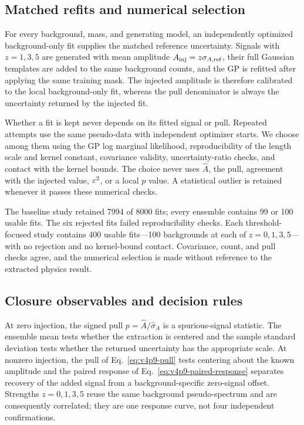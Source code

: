 \subsection{Matched refits and numerical selection}

For every background, mass, and generating model, an independently optimized background-only
fit supplies the matched reference uncertainty.  Signals with
$z=1,3,5$ are generated with mean amplitude
$A_{\rm inj}=z\sigma_{A,{\rm ref}}$, their full Gaussian templates are added to the
same background counts, and the GP is refitted after applying the same training mask.
The injected amplitude is therefore calibrated to the local background-only fit,
whereas the pull denominator is always the uncertainty returned by the injected fit.

Whether a fit is kept never depends on its fitted signal or pull.  Repeated attempts
use the same pseudo-data with independent optimizer starts.  We choose among them using
the GP log marginal likelihood, reproducibility of the length scale and kernel
constant, covariance validity, uncertainty-ratio checks, and contact with the kernel
bounds.  The choice never uses $\widehat A$, the pull, agreement with the injected
value, $\varepsilon^2$, or a local $p$ value.  A statistical outlier is retained whenever it
passes these numerical checks.

The baseline study retained 7994 of 8000 fits; every ensemble contains 99 or 100 usable
fits. The six rejected fits failed reproducibility checks. Each threshold-focused study
contains 400 usable fits---100 backgrounds at each of $z=0,1,3,5$---with no rejection
and no kernel-bound contact. Covariance, count, and pull checks agree, and the numerical
selection is made without reference to the extracted physics result.

\subsection{Closure observables and decision rules}

At zero injection, the signed pull
$p=\widehat A/\widehat\sigma_A$ is a spurious-signal statistic. The ensemble mean
tests whether the extraction is centered and the sample standard deviation tests
whether the returned uncertainty has the appropriate scale. At nonzero injection,
the pull of Eq.~\eqref{eq:v4p9-pull} tests centering about the known amplitude and the
paired response of Eq.~\eqref{eq:v4p9-paired-response} separates recovery of the
added signal from a background-specific zero-signal offset. Strengths
$z=0,1,3,5$ reuse the same background pseudo-spectrum and are consequently
correlated; they are one response curve, not four independent confirmations.

